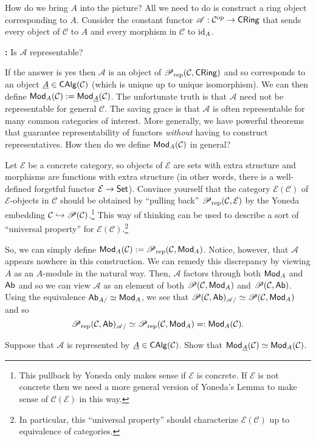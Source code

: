 \documentclass[11pt]{article}
\renewcommand{\C}{\mathcal{C}}
\newcommand{\EE}{\mathcal{E}}
\renewcommand{\A}{\mathscr{A}}
\begin{document}
How do we bring $A$ into the picture? All we need to do is construct a ring object corresponding to $A$. Consider the constant functor $\A: \C^{\op}\to\CRing$ that sends every object of $\C$ to $A$ and every morphism in $\C$ to $\operatorname{id}_A$.

\textbf{:} Is $\A$ representable?

If the answer is yes then $\A$ is an object of $\Pre_{\rep}(\C,\CRing)$ and so corresponds to an object $\un{A}\in\CAlg(\C)$ (which is unique up to unique isomorphism). We can then define $\Mod_A(\C):=\Mod_{\un{A}}(\C)$. The unfortunate truth is that $\A$ need not be representable for general $\C$. The saving grace is that $\A$ is often representable for many common categories of interest. More generally, we have powerful theorems that guarantee representability of functors \emph{without} having to construct representatives. How then do we define $\Mod_A(\C)$ in general?

\begin{exercise}
Let $\EE$ be a concrete category, so objects of $\EE$ are sets with extra structure and morphisms are functions with extra structure (in other words, there is a well-defined forgetful functor $\EE\to\Set$). Convince yourself that the category $\EE(\C)$ of $\EE$-objects in $\C$ should be obtained by ``pulling back'' $\Pre_{\rep}(\C,\EE)$ by the Yoneda embedding $\C\inj\Pre(\C)$.\footnote{This pullback by Yoneda only makes sense if $\EE$ is concrete. If $\EE$ is not concrete then we need a more general version of Yoneda's Lemma to make sense of $\C(\EE)$ in this way.} This way of thinking can be used to describe a sort of ``universal property'' for $\EE(\C)$.\footnote{In particular, this ``universal property'' should characterize $\EE(\C)$ up to equivalence of categories.}
\end{exercise}

So, we can simply define $\Mod_A(\C):=\Pre_{\rep}(\C,\Mod_A)$. Notice, however, that $\A$ appears nowhere in this construction. We can remedy this discrepancy by viewing $A$ as an $A$-module in the natural way. Then, $\A$ factors through both $\operatorname{\mathsf{Mod}}_A$ and $\operatorname{\mathsf{Ab}}$ and so we can view $\A$ as an element of both $\Pre(\C,\Mod_A)$ and $\Pre(\C,\Ab)$. Using the equivalence $\operatorname{\mathsf{Ab}}_{A/}\simeq\operatorname{\mathsf{Mod}}_A$, we see that $\Pre(\C,\Ab)_{\A/}\simeq\Pre(\C,\Mod_A)$ and so 
$$\Pre_{\rep}(\C,\Ab)_{\A/}\simeq\Pre_{\rep}(\C,\Mod_A)=:\Mod_A(\C).$$

\begin{exercise}
Suppose that $\A$ is represented by $\un{A}\in\CAlg(\C)$. Show that $\Mod_{\un{A}}(\C)\simeq\Mod_A(\C)$.
\end{exercise}
\end{document}
